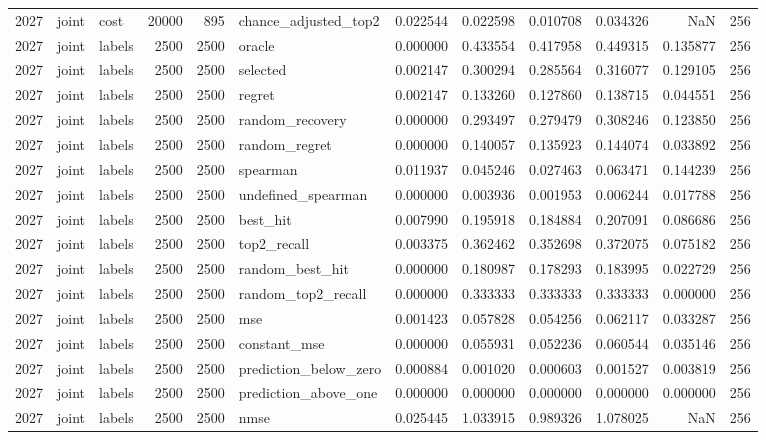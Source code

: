 \begin{tabular}{rllrrlrrrrrr}
2027 & joint & cost & 20000 & 895 & chance_adjusted_top2 & 0.022544 & 0.022598 & 0.010708 & 0.034326 & NaN & 256 \\
2027 & joint & labels & 2500 & 2500 & oracle & 0.000000 & 0.433554 & 0.417958 & 0.449315 & 0.135877 & 256 \\
2027 & joint & labels & 2500 & 2500 & selected & 0.002147 & 0.300294 & 0.285564 & 0.316077 & 0.129105 & 256 \\
2027 & joint & labels & 2500 & 2500 & regret & 0.002147 & 0.133260 & 0.127860 & 0.138715 & 0.044551 & 256 \\
2027 & joint & labels & 2500 & 2500 & random_recovery & 0.000000 & 0.293497 & 0.279479 & 0.308246 & 0.123850 & 256 \\
2027 & joint & labels & 2500 & 2500 & random_regret & 0.000000 & 0.140057 & 0.135923 & 0.144074 & 0.033892 & 256 \\
2027 & joint & labels & 2500 & 2500 & spearman & 0.011937 & 0.045246 & 0.027463 & 0.063471 & 0.144239 & 256 \\
2027 & joint & labels & 2500 & 2500 & undefined_spearman & 0.000000 & 0.003936 & 0.001953 & 0.006244 & 0.017788 & 256 \\
2027 & joint & labels & 2500 & 2500 & best_hit & 0.007990 & 0.195918 & 0.184884 & 0.207091 & 0.086686 & 256 \\
2027 & joint & labels & 2500 & 2500 & top2_recall & 0.003375 & 0.362462 & 0.352698 & 0.372075 & 0.075182 & 256 \\
2027 & joint & labels & 2500 & 2500 & random_best_hit & 0.000000 & 0.180987 & 0.178293 & 0.183995 & 0.022729 & 256 \\
2027 & joint & labels & 2500 & 2500 & random_top2_recall & 0.000000 & 0.333333 & 0.333333 & 0.333333 & 0.000000 & 256 \\
2027 & joint & labels & 2500 & 2500 & mse & 0.001423 & 0.057828 & 0.054256 & 0.062117 & 0.033287 & 256 \\
2027 & joint & labels & 2500 & 2500 & constant_mse & 0.000000 & 0.055931 & 0.052236 & 0.060544 & 0.035146 & 256 \\
2027 & joint & labels & 2500 & 2500 & prediction_below_zero & 0.000884 & 0.001020 & 0.000603 & 0.001527 & 0.003819 & 256 \\
2027 & joint & labels & 2500 & 2500 & prediction_above_one & 0.000000 & 0.000000 & 0.000000 & 0.000000 & 0.000000 & 256 \\
2027 & joint & labels & 2500 & 2500 & nmse & 0.025445 & 1.033915 & 0.989326 & 1.078025 & NaN & 256 \\

\end{tabular}
